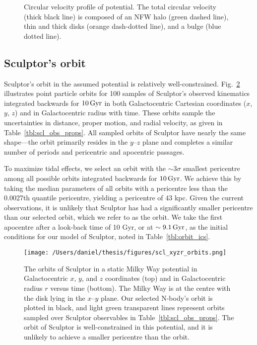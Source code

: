 \begin{figure}
\centering
{}
\caption[Circular velocity of the Milky Way potential]{Circular velocity
profile of \citet{EP2020} potential. The total circular velocity (thick
black line) is composed of an NFW halo (green dashed line), thin and
thick \citet{miyamoto+nagai1975} disks (orange dash-dotted line), and a
\citet{hernquist1990} bulge (blue dotted
line).}\label{fig:v_circ_potential}
\end{figure}

\subsection{Sculptor's orbit}\label{sec:scl_smallperi}

Sculptor's orbit in the assumed potential is relatively
well-constrained. Fig.~\ref{fig:scl_orbits} illustrates point particle
orbits for 100 samples of Sculptor's observed kinematics integrated
backwards for \(10\,{\rm Gyr}\) in both Galactocentric Cartesian coordinates
(\(x\), \(y\), \(z\)) and in Galactocentric radius with time. These
orbits sample the uncertainties in distance, proper motion, and radial
velocity, as given in Table~\ref{tbl:scl_obs_props}. All sampled orbits
of Sculptor have nearly the same shape---the orbit primarily resides in
the \(y\)--\(z\) plane and completes a similar number of periods and
pericentric and apocentric passages.

To maximize tidal effects, we select an orbit with the \(\sim 3\sigma\)
smallest pericentre among all possible orbits integrated backwards for
\(10\,{\rm Gyr}\). We achieve this by taking the median parameters of all
orbits with a pericentre less than the 0.0027th quantile pericentre,
yielding a pericentre of 43 kpc. Given the current observations, it is
unlikely that Sculptor has had a significantly smaller pericentre than
our selected orbit, which we refer to as the \smallperi{} orbit. We take
the first apocentre after a look-back time of 10 Gyr, or at
\(\sim9.1\,{\rm Gyr}\), as the initial conditions for our model of Sculptor,
noted in Table~\ref{tbl:orbit_ics}.

\begin{figure}
\centering
\texttt{[image: /Users/daniel/thesis/figures/scl\_xyzr\_orbits.png]}
\caption[Sculptor's possible orbits]{The orbits of Sculptor in a static
Milky Way potential in Galactocentric \(x\), \(y\), and \(z\)
coordinates (top) and in Galactocentric radius \(r\) versus time
(bottom). The Milky Way is at the centre with the disk lying in the
\(x\)--\(y\) plane. Our selected N-body's \smallperi{} orbit is plotted
in black, and light green transparent lines represent orbits sampled
over Sculptor observables in Table~\ref{tbl:scl_obs_props}. The orbit of
Sculptor is well-constrained in this potential, and it is unlikely to
achieve a smaller pericentre than the \smallperi{}
orbit.}\label{fig:scl_orbits}
\end{figure}

